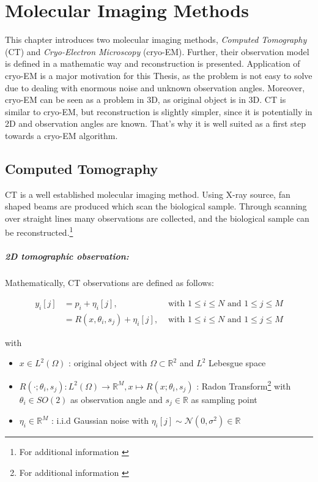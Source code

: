 \chapter{Molecular Imaging Methods}
\label{sec:imaging}

This chapter introduces two molecular imaging methods, \textit{Computed Tomography} (CT) and 
\textit{Cryo-Electron Microscopy} (cryo-EM). 
Further, their observation model is defined in a mathematic way and reconstruction is presented.
Application of cryo-EM is a major motivation for this Thesis, 
as the problem is not easy to solve due to dealing with enormous noise and unknown observation angles.
Moreover, cryo-EM can be seen as a problem in 3D, as original object is in 3D.
CT is similar to cryo-EM, but reconstruction is slightly simpler, since it is potentially in 2D and 
observation angles are known.
That's why it is well suited as a first step towards a cryo-EM algorithm.



\section{Computed Tomography}
CT is a well established molecular imaging method.
Using X-ray source, fan shaped beams are produced which scan the biological sample.
Through scanning over straight lines many observations are collected, 
and the biological sample can be reconstructed.\footnote{For additional information \cite{computedTomography}}

\paragraph{2D tomographic observation:}

Mathematically, CT observations are defined as follows:

\begin{equation}
    \label{eq:2Dreconstruction}
    \begin{aligned}
        y_i[j] &= p_i + \eta_i[j], & \text{ with } 1 \leq i \leq N \text{ and } 1 \leq j \leq M \\
               &= R(x, \theta_i, s_j) + \eta_i[j], & \text{ with } 1 \leq i \leq N \text{ and } 1 \leq j \leq M
    \end{aligned}
\end{equation}

with
\begin{itemize}
    \item $x \in L^2(\Omega)$ : original object with $\Omega \subset \mathbb{R}^2 $ and $L^2$ Lebesgue space
    \item $R(\cdot; \theta_i, s_j): L^2(\Omega) \to \mathbb{R}^M , x \mapsto R(x; \theta_i, s_j)$ : Radon Transform\footnote{For additional information \cite{radonTransform}} 
        with $\theta_i \in SO(2)$ as observation angle and $s_j \in \mathbb{R}$ as sampling point
    \item $\eta_i \in \mathbb{R}^M$ : i.i.d Gaussian noise with $\eta_i[j] \sim \mathcal{N}(0,\sigma^2) \in \mathbb{R}$
\end{itemize}


